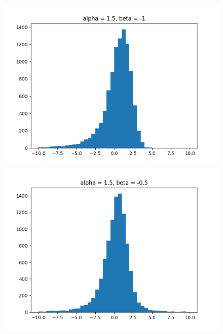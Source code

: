 \documentclass[11pt, twocolumn]{article}
\begin{document}
\begin{figure}[h]
    \begin{minipage}{0.2\textwidth}
        \centering
        \includegraphics[width=\textwidth]{q4_1_a1.5_bn1}
    \end{minipage}%
    \begin{minipage}{0.2\textwidth}
        \centering
        \includegraphics[width=\textwidth]{q4_1_a1.5_bn0.5}
    \end{minipage}%
    \begin{minipage}{0.2\textwidth}
        \centering

\end{minipage}
\end{figure}
\end{document}
